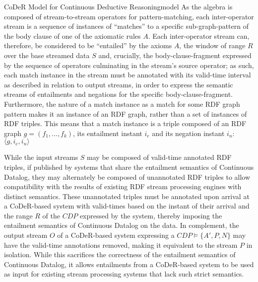 \begin{nestedsection}{CoDeR Model for Continuous Deductive Reasoning}{model}
	As the algebra is composed of stream-to-stream operators for pattern-matching, each inter-operator stream is a sequence of instances of ``matches'' to a specific sub-graph-pattern of the body clause of one of the axiomatic rules $A$.
	Each inter-operator stream can, therefore, be considered to be ``entailed'' by the axioms $A$, the window of range $R$ over the base streamed data $S$ and, crucially, the body-clause-fragment expressed by the sequence of operators culminating in the stream's source operator;
	as such, each match instance in the stream must be annotated with its valid-time interval as described in relation to output streams, in order to express the semantic streams of entailments and negations for the specific body-clause-fragment.
	Furthermore, the nature of a match instance as a match for some RDF graph pattern makes it an instance of an RDF graph, rather than a set of instances of RDF triples.
	This means that a match instance is a triple composed of an RDF graph ${g = (f_1,\dots,f_k)}$, its entailment instant $i_{e}$ and its negation instant $i_{n}$: ${\langle g,i_{e},i_{n} \rangle}$

	While the input streams $S$ may be composed of valid-time annotated RDF triples, if published by systems that share the entailment semantics of Continuous Datalog, they may alternately be composed of unannotated RDF triples to allow compatibility with the results of existing RDF stream processing engines with distinct semantics.
	These unannotated triples must be annotated upon arrival at a CoDeR-based system with valid-times based on the instant of their arrival and the range $R$ of the ${CDP}$ expressed by the system, thereby imposing the entailment semantics of Continuous Datalog on the data.
	In complement, the output stream $O$ of a CoDeR-based system expressing a ${CDP \vDash \{A',P,N\}}$ may have the valid-time annotations removed, making it equivalent to the stream $P$ in isolation.
	While this sacrifices the correctness of the entailment semantics of Continuous Datalog, it allows entailments from a CoDeR-based system to be used as input for existing stream processing systems that lack such strict semantics.


\end{nestedsection}